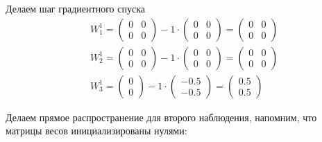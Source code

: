 \begin{sol}
Делаем шаг градиентного спуска
\begin{equation*} 
	\begin{aligned}
		& W_1^1 = \begin{pmatrix} 0 & 0 \\ 0 & 0 \end{pmatrix} - 1 \cdot \begin{pmatrix} 0 & 0 \\ 0 & 0 \end{pmatrix} = \begin{pmatrix} 0 & 0 \\ 0 & 0 \end{pmatrix}\\
		& W_2^1 = \begin{pmatrix} 0 & 0 \\ 0 & 0 \end{pmatrix} - 1 \cdot \begin{pmatrix} 0 & 0 \\ 0 & 0 \end{pmatrix} = \begin{pmatrix} 0 & 0 \\ 0 & 0 \end{pmatrix} \\
		& W_3^1 = \begin{pmatrix} 0 \\ 0 \end{pmatrix} - 1 \cdot \begin{pmatrix} -0.5 \\ -0.5 \end{pmatrix} = \begin{pmatrix} 0.5 \\ 0.5 \end{pmatrix}
	\end{aligned}
\end{equation*}

 Делаем прямое распространение для второго наблюдения, напомним, что матрицы весов инициализированы нулями:

\begin{center}
\end{center}
\end{sol}
